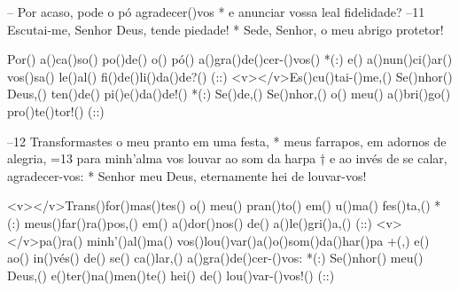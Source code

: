 – Por acaso, pode o pó agradecer()vos *
e anunciar vossa leal fidelidade?
–11 Escutai-me, Senhor Deus, tende piedade! *
Sede, Senhor, o meu abrigo protetor!

Por() a()ca()so() po()de() o() pó() a()gra()de()cer-()vos() *(:)
e() a()nun()ci()ar() vos()sa() le()al() fi()de()li()da()de?() (::)
<v></v>Es()cu()tai-()me,() Se()nhor() Deus,() ten()de() pi()e()da()de!() *(:)
Se()de,() Se()nhor,() o() meu() a()bri()go() pro()te()tor!() (::)

–12 Transformastes o meu pranto em uma festa, *
meus farrapos, em adornos de alegria,
=13 para minh’alma vos louvar ao som da harpa †
e ao invés de se calar, agradecer-vos: *
Senhor meu Deus, eternamente hei de louvar-vos!

<v></v>Trans()for()mas()tes() o() meu() pran()to() em() u()ma() fes()ta,() *(:)
meus()far()ra()pos,() em() a()dor()nos() de() a()le()gri()a,() (::)
<v></v>pa()ra() minh'()al()ma() vos()lou()var()a()o()som()da()har()pa +(,)
e() ao() in()vés() de() se() ca()lar,() a()gra()de()cer-()vos: *(:)
Se()nhor() meu() Deus,() e()ter()na()men()te() hei() de() lou()var-()vos!() (::)
